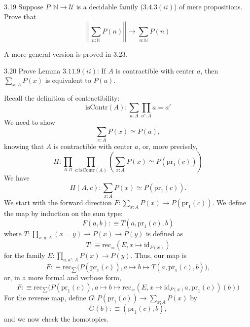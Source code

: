 \documentclass[14pt]{extarticle}
\newcommand{\N}{{\mathbb N}}
\newcommand{\0}{{\mathbf 0}}
\newcommand{\1}{{\mathbf 1}}
\newcommand{\2}{{\mathbf 2}}
\newcommand{\UU}{{\mathcal U}}
\newcommand{\mt}{\mapsto}
\newcommand{\rec}{\mathrm{rec}}
\newcommand{\pr}{\mathrm{pr}}
\newcommand{\id}{\mathrm{id}}
\newcommand{\isContr}{\mathrm{isContr}}
\begin{document}
\begin{prob}{3.19}{}
Suppose $P : \N \to \UU$ is a decidable family ($3.4.3(ii)$) of mere propositions. Prove that 
\[\left|\left|\sum_{n : \N}P(n) \right| \right| \to \sum_{n:\N}P(n)\]
\end{prob}
A more general version is proved in $3.23$.

\begin{prob}{3.20}{}
Prove Lemma $3.11.9(ii)$: If $A$ is contractible with center $a$, then $\sum_{x : A}P(x)$ is equivalent to $P(a)$.
\end{prob}
Recall the definition of contractibility:
\[\isContr(A) : \sum_{a:A}\prod_{a':A}a = a'\]
We need to show
\[\sum_{x:A}P(x) \simeq P(a),\] knowing that $A$ is contractible with center $a$, or, more precisely,
\[H : \prod_{A:\UU} \prod_{c:\isContr(A)} \left(\sum_{x:A}P(x) \simeq P(\pr_1(c)) \right)\]
We have
\[H(A,c) : \sum_{x:A}P(x) \simeq P(\pr_1(c)).\] We start with the forward direction $F : \sum_{x:A}P(x) \to P(\pr_1(c))$. We define the map by induction on the sum type:
\[F(a,b) :\equiv T(a,\pr_1(c),b)\] where $T : \prod_{x,y:A}(x = y) \to P(x) \to P(y)$ is defined as 
\[T :\equiv \rec_{=}(E,x \mt \id_{P(x)})\] for the family $E : \prod_{a,a':A} P(x) \to P(y)$. Thus, our map is
\[F :\equiv \rec_{\sum}\Big(P(\pr_1(c)), a \mt b \mt T(a,\pr_1(c),b)\Big),\] or, in a more formal and verbose form,
\[F :\equiv \rec_{\sum}\Big(P(\pr_1(c)), a \mt b \mt \rec_{=}(E,x \mt \id_{P(x)}a,\pr_1(c))(b)\Big)\]
For the reverse map, define $G : P(\pr_1(c)) \to \sum_{x:A}P(x)$ by 
\[G(b): \equiv (\pr_1(c),b),\] and we now check the homotopies.
\end{document}
